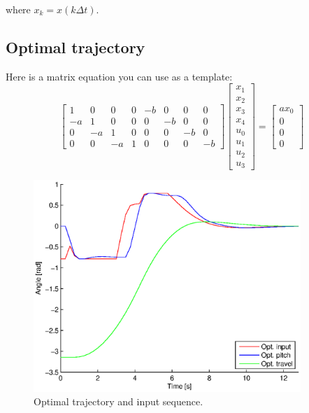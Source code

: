 where $x_k = x(k\Delta t)$.

\subsection{Optimal trajectory}

Here is a matrix equation you can use as a template:
\begin{equation}
\begin{bmatrix}
 1 &  0 &  0 & 0 & -b &  0 &  0 &  0 \\
-a &  1 &  0 & 0 &  0 & -b &  0 &  0 \\
 0 & -a &  1 & 0 &  0 &  0 & -b &  0 \\
 0 &  0 & -a & 1 &  0 &  0 &  0 & -b                                
\end{bmatrix}
\begin{bmatrix} x_1 \\ x_2 \\ x_3 \\ x_4 \\ u_0 \\ u_1 \\ u_2 \\ u_3 \end{bmatrix}
=
\begin{bmatrix}
ax_0 \\ 0 \\ 0 \\ 0      
\end{bmatrix}
\end{equation}

\begin{figure}[hp]
	\centering
		\includegraphics[width=0.9\textwidth]{figures/2/opt_traj.eps}
	\caption{Optimal trajectory and input sequence.}
	\label{fig:opt_traj}
\end{figure}

